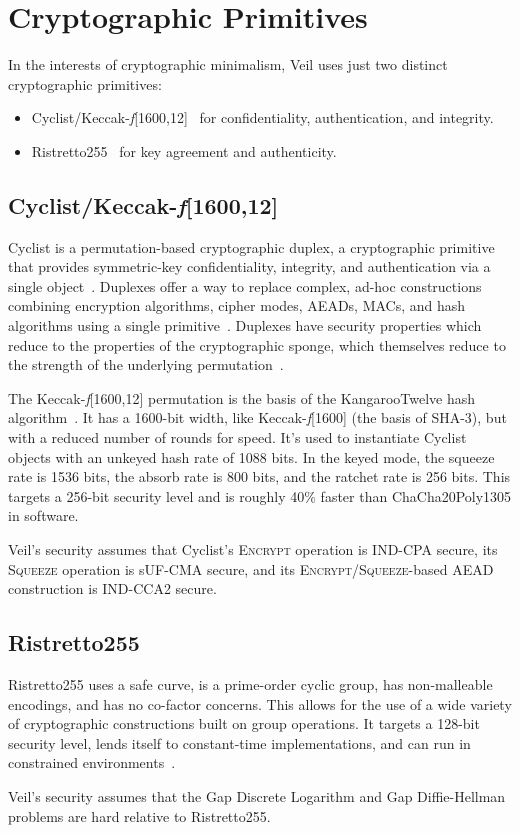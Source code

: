 \section{Cryptographic Primitives}\label{sec:cryptographic-primitives}

In the interests of cryptographic minimalism, Veil uses just two distinct cryptographic primitives:

\begin{itemize}
    \item Cyclist/Keccak-\emph{f}[1600,12]~\cite{daemen2020,bertoni2018} for confidentiality, authentication, and
    integrity.
    \item Ristretto255~\cite{deValence2020} for key agreement and authenticity.
\end{itemize}

\subsection{Cyclist/Keccak-\emph{f}[1600,12]}\label{subsec:cyclist}

Cyclist is a permutation-based cryptographic duplex, a cryptographic primitive that provides symmetric-key
confidentiality, integrity, and authentication via a single object~\cite{daemen2020}.
Duplexes offer a way to replace complex, ad-hoc constructions combining encryption algorithms, cipher modes,
AEADs, MACs, and hash algorithms using a single primitive~\cite{daemen2020, bertoni2011duplex}.
Duplexes have security properties which reduce to the properties of the cryptographic sponge, which themselves reduce to
the strength of the underlying permutation~\cite{bertoni2008}.

The Keccak-\emph{f}[1600,12] permutation is the basis of the KangarooTwelve hash algorithm~\cite{bertoni2018}.
It has a 1600-bit width, like Keccak-\emph{f}[1600] (the basis of SHA-3), but with a reduced number of rounds for speed.
It's used to instantiate Cyclist objects with an unkeyed hash rate of 1088 bits.
In the keyed mode, the squeeze rate is 1536 bits, the absorb rate is 800 bits, and the ratchet rate is 256 bits.
This targets a 256-bit security level and is roughly 40\% faster than ChaCha20Poly1305 in software.

Veil's security assumes that Cyclist's \textsc{Encrypt} operation is IND-CPA secure, its
\textsc{Squeeze} operation is sUF-CMA secure, and its
\textsc{Encrypt}/\textsc{Squeeze}-based AEAD construction is IND-CCA2 secure.

\subsection{Ristretto255}\label{subsec:ristretto255}

Ristretto255 uses a safe curve, is a prime-order cyclic group, has non-malleable encodings, and has no
co-factor concerns.
This allows for the use of a wide variety of cryptographic constructions built on group operations.
It targets a 128-bit security level, lends itself to constant-time implementations, and can run in constrained
environments~\cite{deValence2018}.

Veil's security assumes that the Gap Discrete Logarithm and Gap Diffie-Hellman problems are hard relative to
Ristretto255.

